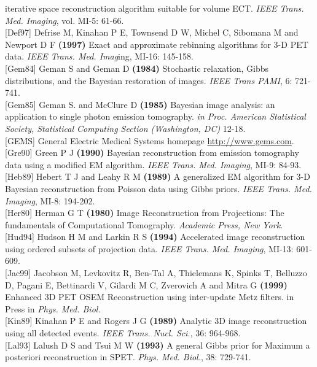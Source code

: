 \documentclass{article}
\begin{document}
iterative space reconstruction algorithm suitable for volume 
ECT. \textit{IEEE Trans. Med. Imaging}, vol. MI-5: 61-66.\\
{[}Def97{]} Defrise M, Kinahan P E, Townsend D W, Michel C, Sibomana 
M and Newport D F \textbf{(1997)} Exact and approximate rebinning 
algorithms for 3-D PET data. \textit{IEEE Trans. Med. Imag}ing, MI-16: 
145-158.\\
{[}Gem84{]} Geman S and Geman D \textbf{(1984)} Stochastic relaxation, 
Gibbs distributions, and the Bayesian restoration of images. \textit{IEEE 
Trans PAMI}, 6: 721-741.\\
{[}Gem85{]} Geman S. and McClure D \textbf{(1985)} Bayesian image analysis: 
an application to single photon emission tomography. \textit{in Proc. 
American Statistical Society, Statistical Computing Section (Washington, 
DC)} 12-18.\\
{[}GEMS{]} General Electric Medical Systems homepage {\underline {http://www.gems.com}}.\\
{[}Gre90{]} Green P J \textbf{(1990)} Bayesian reconstruction from emission 
tomography data using a modified EM algorithm. \textit{IEEE Trans. 
Med. Imaging}, MI-9: 84-93.\\
{[}Heb89{]} Hebert T J and Leahy R M \textbf{(1989)} A generalized EM 
algorithm for 3-D Bayesian reconstruction from Poisson data using 
Gibbs priors. \textit{IEEE Trans. Med. Imaging}, MI-8: 194-202.\\
{[}Her80{]} Herman G T \textbf{(1980)} Image Reconstruction from Projections: 
The fundamentals of Computational Tomography. \textit{Academic Press, 
New York}.\\
{[}Hud94{]} Hudson H M and Larkin R S \textbf{(1994)} Accelerated image 
reconstruction using ordered subsets of projection data. \textit{IEEE 
Trans. Med. Imaging}, MI-13: 601-609.\\
{[}Jac99{]} Jacobson M, Levkovitz R, Ben-Tal A, Thielemans K, Spinks 
T, Belluzzo D, Pagani E, Bettinardi V, Gilardi M C, Zverovich 
A and Mitra G \textbf{(1999)} Enhanced 3D PET OSEM Reconstruction 
using inter-update Metz filters. in Press in \textit{Phys. Med. Biol.}\\
{[}Kin89{]} Kinahan P E and Rogers J G \textbf{(1989)} Analytic 3D image 
reconstruction using all detected events. \textit{IEEE Trans. Nucl. 
Sci.}, 36: 964-968. \\
{[}Lal93{]} Lalush D S and Tsui M W \textbf{(1993)} A general Gibbs prior 
for Maximum a posteriori reconstruction in SPET. \textit{Phys. Med. 
Biol.}, 38: 729-741.\\
\end{document}
